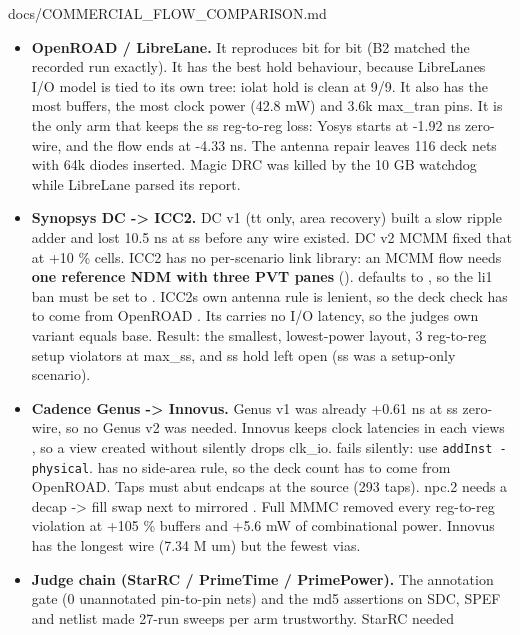 \begin{relocated}{docs/COMMERCIAL_FLOW_COMPARISON.md}
\begin{itemize}
\tightlist
\item
  \textbf{OpenROAD / LibreLane.} It reproduces bit for bit (B2 matched
  the recorded run exactly). It has the best hold behaviour, because
  LibreLane\textquotesingle s I/O model is tied to its own tree: iolat
  hold is clean at 9/9. It also has the most buffers, the most clock
  power (42.8 mW) and 3.6k max\_tran pins. It is the only arm that keeps
  the ss reg-to-reg loss: Yosys starts at -1.92 ns zero-wire, and the
  flow ends at -4.33 ns. The antenna repair leaves 116 deck nets with
  64k diodes inserted. Magic DRC was killed by the 10 GB watchdog while
  LibreLane parsed its report.
\item
  \textbf{Synopsys DC -\textgreater{} ICC2.} DC v1 (tt only, area
  recovery) built a slow ripple adder and lost 10.5 ns at ss before any
  wire existed. DC v2 MCMM fixed that at +10 \% cells. ICC2 has no
  per-scenario link library: an MCMM flow needs \textbf{one reference
  NDM with three PVT panes} ().
   defaults to , so
  the li1 ban must be set to . ICC2\textquotesingle s own
  antenna rule is lenient, so the deck check has to come from OpenROAD
  . Its  carries no I/O latency, so
  the judge\textquotesingle s own variant equals base. Result: the
  smallest, lowest-power layout, 3 reg-to-reg setup violators at
  max\_ss, and ss hold left open (ss was a setup-only scenario).
\item
  \textbf{Cadence Genus -\textgreater{} Innovus.} Genus v1 was already
  +0.61 ns at ss zero-wire, so no Genus v2 was needed. Innovus keeps
  clock latencies in each view\textquotesingle s , so
  a view created without  silently drops clk\_io.
   fails silently: use
  \texttt{addInst\ -\allowbreak{}physical}. 
  has no side-area rule, so the deck count has to come from OpenROAD.
  Taps must abut endcaps at the source (293 taps). npc.2 needs a decap
  -\textgreater{} fill swap next to mirrored . Full MMMC
  removed every reg-to-reg violation at +105 \% buffers and +5.6 mW of
  combinational power. Innovus has the longest wire (7.34 M um) but the
  fewest vias.
\item
  \textbf{Judge chain (StarRC / PrimeTime / PrimePower).} The annotation
  gate (0 unannotated pin-to-pin nets) and the md5 assertions on SDC,
  SPEF and netlist made 27-run sweeps per arm trustworthy. StarRC needed

\end{itemize}
\end{relocated}
